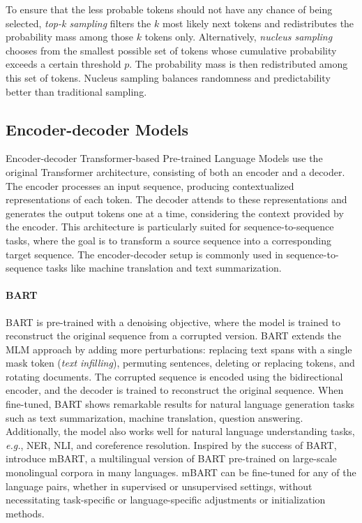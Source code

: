 To ensure that the less probable tokens should not have any chance of being selected, \textit{top-k sampling} \citep{fan2018hierarchical} filters the $k$ most likely next tokens and redistributes the probability mass among those $k$ tokens only. Alternatively, \textit{nucleus sampling} chooses from the smallest possible set of tokens whose cumulative probability exceeds a certain threshold $p$. The probability mass is then redistributed among this set of tokens. Nucleus sampling balances randomness and predictability better than traditional sampling.

\subsection{Encoder-decoder Models}

Encoder-decoder Transformer-based Pre-trained Language Models use the original Transformer architecture, consisting of both an encoder and a decoder. The encoder processes an input sequence, producing contextualized representations of each token. The decoder attends to these representations and generates the output tokens one at a time, considering the context provided by the encoder. This architecture is particularly suited for sequence-to-sequence tasks, where the goal is to transform a source sequence into a corresponding target sequence. The encoder-decoder setup is commonly used in sequence-to-sequence tasks like machine translation and text summarization.

\paragraph{BART} \ac{BART} \citep{lewis2019bart} is pre-trained with a denoising objective, where the model is trained to reconstruct the original sequence from a corrupted version. \ac{BART} extends the \ac{MLM} approach by adding more perturbations: replacing text spans with a single mask token (\textit{text infilling}), permuting sentences, deleting or replacing tokens, and rotating documents. The corrupted sequence is encoded using the bidirectional encoder, and the decoder is trained to reconstruct the original sequence. When fine-tuned, \ac{BART} shows remarkable results for natural language generation tasks such as text summarization, machine translation, question answering. Additionally, the model also works well for natural language understanding tasks, \textit{e.g.}, \ac{NER}, \ac{NLI}, and coreference resolution. Inspired by the success of \ac{BART}, \citet{liu2020multilingual} introduce mBART, a multilingual version of \ac{BART} pre-trained on large-scale monolingual corpora in many languages. mBART can be fine-tuned for any of the language pairs, whether in supervised or unsupervised settings, without necessitating task-specific or language-specific adjustments or initialization methods.

